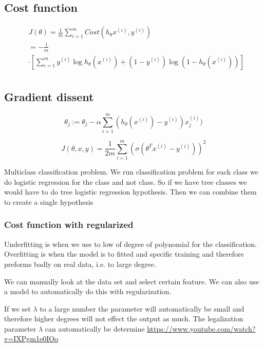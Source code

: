 \begin{multicols}{2}
\subsection{Cost function}
\begin{align*}
    &J(\theta) = \frac{1}{m}\sum_{i=1}^m Cost(h_{\theta}x^{(i)},y^{(i)}) \\
    &= -\frac{1}{m} \\
    &\cdot\left[\sum_{i=1}^m y^{(i)}\log{h_{\theta}(x^{(i)}) + (1-y^{(i)})\log(1-h_{\theta}(x^{(i)}))}\right] \\
\end{align*}

\subsection{Gradient dissent}
\begin{equation*}
    \theta_j := \theta_j -\alpha\sum_{i=1}^m (h_{\theta}(x^{(i)}) - y^{(i)})x_j^{(i)})
\end{equation*}

\begin{equation*}
    J(\theta, x, y) = \frac{1}{2m}\sum_{i=1}^m\left( \sigma\left( \theta^Tx^{(i)} -y^{(i)} \right) \right)^2
\end{equation*}

Multiclass classification problem.
We run classification problem for each class we do logistic regression for 
the class and not class. So if we have tree classes we would have to do tree 
logistic regression hypothesis. Then we can combine them to create a single hypothesis


\subsubsection{Cost function with regularized}
Underfitting is when we use to low of degree of polynomial for the classification.
Overfitting is when the model is to fitted and specific training and therefore preforms badly 
on real data, i.e. to large degree.

We can manually look at the data set and select certain feature.
We can also use a model to automatically do this with regularization.

If we set $\lambda$ to a large number the parameter will automatically be small and 
therefore higher degrees will not effect the output as much.
The legalization parameter $\lambda$ can automatically be determine \newline
\url{https://www.youtube.com/watch?v=IXPgm1e0IOo}


\end{multicols}
